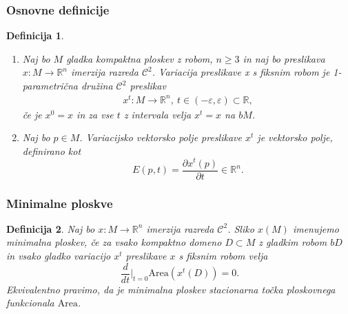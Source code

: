 \documentclass[9pt, table]{beamer}
\newtheorem{definicija}{Definicija}
\newcommand{\R}{\mathbb R}
\begin{document}

\begin{frame}
\frametitle{Osnovne definicije}

\begin{definicija}
\begin{enumerate}
\item
Naj bo $M$ gladka kompaktna ploskev z robom, $n \geq 3$ in naj bo preslikava $x \colon M \to \R^{n}$ imerzija razreda $\mathcal{C}^2$. \textup{Variacija preslikave x s fiksnim robom} je 1-parametrična družina $\mathcal{C}^2$ preslikav 
\begin{gather}
x^{t} \colon M \to \R^{n},\ t \in (-\varepsilon, \varepsilon) \subset \R,
\end{gather}
če je $x^0 = x$ in za vse $t$ z intervala velja $x^{t} = x$ na $bM$.
%
\item
Naj bo $p \in M$. \textup{Variacijsko vektorsko polje} preslikave $x^{t}$ je vektorsko polje, definirano kot
\begin{equation}
E(p,t) = \frac{\partial{x^t(p)}}{\partial{t}} \in \R^{n}.
\end{equation}
\end{enumerate}
\end{definicija}

\end{frame}


\begin{frame}
\frametitle{Minimalne ploskve}

\begin{definicija}
Naj bo $x \colon M \to \R^{n}$ imerzija razreda $\mathcal{C}^2$. Sliko $x(M)$ imenujemo \textup{minimalna ploskev}, če za vsako kompaktno domeno $D \subset M$ z gladkim robom $bD$ in vsako gladko variacijo $x^{t}$ preslikave $x$ s fiksnim robom velja
\begin{equation} \label{eq:1-var-ploščine}
\frac{d}{dt} \Big|_{t=0} \text{Area}(x^{t}(D)) = 0.
\end{equation}
Ekvivalentno pravimo, da je minimalna ploskev stacionarna točka ploskovnega funkcionala $\text{Area}$.
\end{definicija}

\end{frame}

\end{document}
